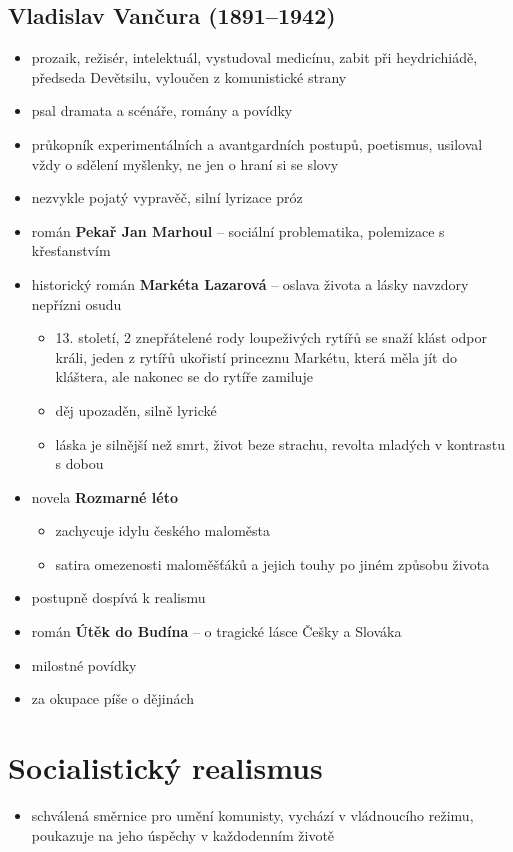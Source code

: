 \subsection{Vladislav Vančura (1891--1942)}
\begin{itemize}
\item prozaik, režisér, intelektuál, vystudoval medicínu, zabit při heydrichiádě, předseda Devětsilu, vyloučen z komunistické strany
\item psal dramata a scénáře, romány a povídky
\item průkopník experimentálních a avantgardních postupů, poetismus, usiloval vždy o sdělení myšlenky, ne jen o hraní si se slovy
\item nezvykle pojatý vypravěč, silní lyrizace próz
\item román \textbf{Pekař Jan Marhoul} -- sociální problematika, polemizace s křesťanstvím
\item historický román \textbf{Markéta Lazarová} -- oslava života a lásky navzdory nepřízni osudu
	\begin{itemize}
	\item 13. století, 2 znepřátelené rody loupeživých rytířů se  snaží klást odpor králi, jeden z rytířů ukořistí princeznu Markétu, která měla jít do kláštera, ale nakonec se do rytíře zamiluje
	\item děj upozaděn, silně lyrické
	\item láska je silnější než smrt, život beze strachu, revolta mladých v kontrastu s dobou
	\end{itemize}
\item novela \textbf{Rozmarné léto}
	\begin{itemize}
	\item zachycuje idylu českého maloměsta
	\item satira omezenosti maloměšťáků a jejich touhy po jiném způsobu života
	\end{itemize}
\item postupně dospívá k realismu
\item román \textbf{Útěk do Budína} -- o tragické lásce Češky a Slováka
\item milostné povídky
\item za okupace píše o dějinách
\end{itemize}

\section{Socialistický realismus}
\begin{itemize}
\item schválená směrnice pro umění komunisty, vychází v vládnoucího režimu, poukazuje na jeho úspěchy v každodenním životě
\end{itemize}

